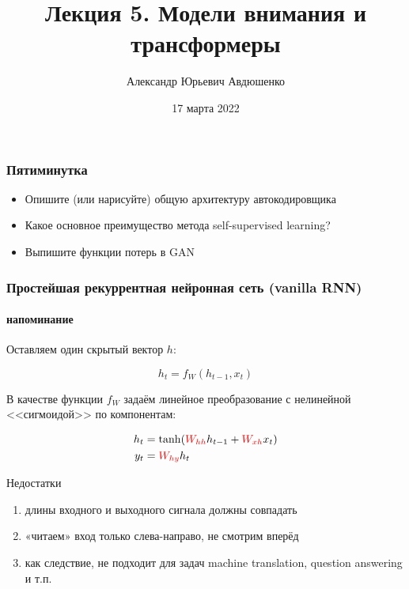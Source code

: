 \documentclass[fullscreen=true, bookmarks=true, hyperref={pdfencoding=unicode}]{beamer}
\title{Лекция 5. Модели внимания и трансформеры}
\author{Александр Юрьевич Авдюшенко}
\institute{МКН СПбГУ}
\date{17 марта 2022}
\begin{document}

\begin{frame}
\transdissolve[duration=0.2]
\titlepage
\end{frame}


\begin{frame}
  \frametitle{Пятиминутка}
  \begin{itemize}
    \item Опишите (или нарисуйте) общую архитектуру автокодировщика
    \item Какое основное преимущество метода self-supervised learning?
    \item Выпишите функции потерь в GAN
  \end{itemize}
\end{frame}


\begin{frame}
  \frametitle{Простейшая рекуррентная нейронная сеть (vanilla RNN)}
  \framesubtitle{напоминание}

  Оставляем один скрытый вектор $h$:

  $$ h_t = f_W(h_{t-1}, x_t)$$

  В качестве функции $f_W$ задаём линейное преобразование с нелинейной <<сигмоидой>> по компонентам:

  \begin{align*}
       h_t &= \tanh ({\color{red}W_{hh}} h_{t-1} + {\color{red}W_{xh}} x_t) \\
       y_t &= {\color{red}W_{hy}} h_t
  \end{align*}

  Недостатки
  \begin{enumerate}
    \item длины входного и выходного сигнала должны совпадать
    \item «читаем» вход только слева-направо, не смотрим вперёд
    \item как следствие, не подходит для задач machine translation, question answering и т.п.
  \end{enumerate}

\end{frame}
\end{document}

